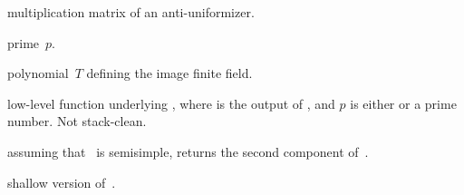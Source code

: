  multiplication matrix of an
anti-uniformizer.

 prime~$p$.

 polynomial~$T$ defining the image finite
field.



 low-level function underlying
, where  is the output of
, and $p$ is either  or a prime
number. Not stack-clean.

 assuming that~ is
semisimple, returns the second component of~.

 shallow version
of~.

\newpage
